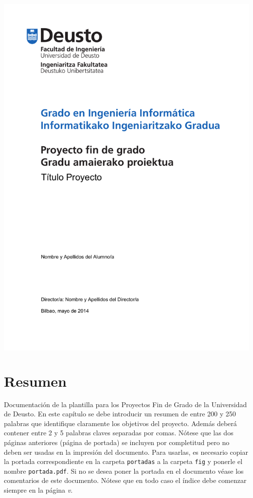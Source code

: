 \documentclass{DeustoFDP}
\begin{document}
\frontmatter 
\pagestyle{plain}

\begin{titlepage} 
  \includegraphics{fig/portada}
  \restoregeometry
\end{titlepage}
\cleardoublepage


\chapter*{Resumen}

Documentaci\'on de la plantilla  para los Proyectos Fin de Grado
de la Universidad de Deusto. En este cap\'itulo se debe introducir un resumen de
entre 200 y 250 palabras que identifique claramente los objetivos del proyecto.
Adem\'as deber\'a contener entre 2 y 5 palabras claves separadas por comas.
N\'otese que las dos p\'aginas anteriores (p\'agina de portada) se incluyen por 
completitud pero no deben ser usadas en la impresi\'on del documento.
Para usarlas, es necesario copiar la portada correspondiente en la carpeta 
\verb+portadas+ a la carpeta \verb+fig+ y ponerle el nombre 
\verb+portada.pdf+. Si no se desea poner la portada en el documento 
 v\'ease los comentarios de este documento. N\'otese que en 
todo caso el \'indice debe comenzar siempre en la p\'agina \textit{v}.
\end{document}
